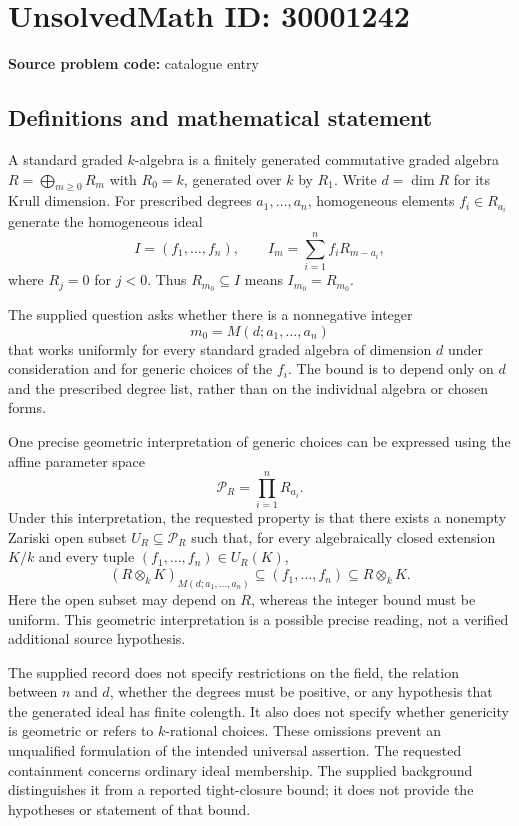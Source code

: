\documentclass[11pt]{article}
\begin{document}
\section*{UnsolvedMath ID: 30001242}
\textbf{Source problem code:} catalogue entry
\subsection{Definitions and mathematical statement}
A standard graded \(k\)-algebra is a finitely generated commutative graded algebra \(R=\bigoplus_{m\geq 0}R_m\) with \(R_0=k\), generated over \(k\) by \(R_1\). Write \(d=\dim R\) for its Krull dimension. For prescribed degrees \(a_1,\ldots,a_n\), homogeneous elements \(f_i\in R_{a_i}\) generate the homogeneous ideal
\[
I=(f_1,\ldots,f_n),\qquad I_m=\sum_{i=1}^n f_iR_{m-a_i},
\]
where \(R_j=0\) for \(j<0\). Thus \(R_{m_0}\subseteq I\) means \(I_{m_0}=R_{m_0}\).

The supplied question asks whether there is a nonnegative integer
\[
m_0=M(d;a_1,\ldots,a_n)
\]
that works uniformly for every standard graded algebra of dimension \(d\) under consideration and for generic choices of the \(f_i\). The bound is to depend only on \(d\) and the prescribed degree list, rather than on the individual algebra or chosen forms.

One precise geometric interpretation of generic choices can be expressed using the affine parameter space
\[
\mathcal P_R=\prod_{i=1}^n R_{a_i}.
\]
Under this interpretation, the requested property is that there exists a nonempty Zariski open subset \(U_R\subseteq\mathcal P_R\) such that, for every algebraically closed extension \(K/k\) and every tuple \((f_1,\ldots,f_n)\in U_R(K)\),
\[
(R\otimes_k K)_{M(d;a_1,\ldots,a_n)}
\subseteq (f_1,\ldots,f_n)\subseteq R\otimes_k K.
\]
Here the open subset may depend on \(R\), whereas the integer bound must be uniform. This geometric interpretation is a possible precise reading, not a verified additional source hypothesis.

The supplied record does not specify restrictions on the field, the relation between \(n\) and \(d\), whether the degrees must be positive, or any hypothesis that the generated ideal has finite colength. It also does not specify whether genericity is geometric or refers to \(k\)-rational choices. These omissions prevent an unqualified formulation of the intended universal assertion. The requested containment concerns ordinary ideal membership. The supplied background distinguishes it from a reported tight-closure bound; it does not provide the hypotheses or statement of that bound.
\end{document}
